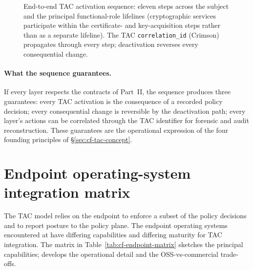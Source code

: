 \begin{figure}[H]
\caption{End-to-end TAC activation sequence: eleven steps across
the subject and the principal functional-role lifelines
(cryptographic services participate within the certificate- and
key-acquisition steps rather than as a separate lifeline). The TAC \texttt{correlation\_id}
(Crimson) propagates through every step; deactivation reverses
every consequential change.}
\label{fig:cf-activation-sequence}
\end{figure}

\paragraph{What the sequence guarantees.} If every layer respects
the contracts of Part~II, the sequence produces three
guarantees: every TAC activation is the consequence of a recorded
policy decision; every consequential change is reversible by
the deactivation path; every layer's actions can be correlated
through the TAC identifier for forensic and audit reconstruction.
These guarantees are the operational expression of the four
founding principles of \S\ref{sec:cf-tac-concept}.

\section{Endpoint operating-system integration matrix}
\label{sec:cf-endpoint-matrix}

The TAC model relies on the endpoint to enforce a subset of
the policy decisions and to report posture to the policy plane.
The endpoint operating systems encountered at 
have differing capabilities and
differing maturity for TAC integration. The matrix in
Table~\ref{tab:cf-endpoint-matrix} sketches the principal
capabilities;  develops the operational
detail and the OSS-vs-commercial trade-offs.

